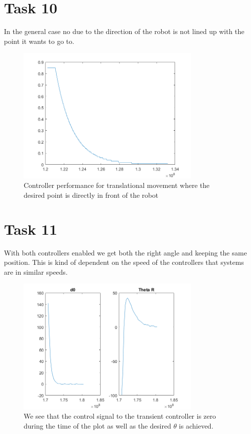 \documentclass[a4paper,12pt,oneside,onecolumn]{article} %
\begin{document}
\section*{Task 10}
In the general case no due to the direction of the robot is not lined up with the point it wants to go to. 
\begin{figure}[H]
\begin{center}	
  \includegraphics[width = 0.8\textwidth]{task10.png}
  \caption{Controller performance for translational movement where the desired point is directly in front of the robot}
 \end{center}
\end{figure}

\section*{Task 11}
With both controllers enabled we get both the right angle and keeping the same position. This is kind of dependent on the speed of the controllers that systems are in similar speeds.
\begin{figure}[H]
\begin{center}	
  \includegraphics[width = 0.8\textwidth]{task11.png}
  \caption{We see that the control signal to the transient controller is zero during the time of the plot as well as the desired $\theta$ is achieved.}
 \end{center}
\end{figure}
\end{document}
